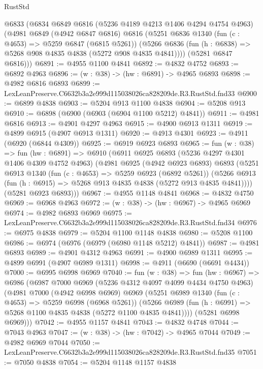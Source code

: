 \begin{lexlean}{RustStd}
\begin{coremodule}
  @6833
    (@6834
      @6849
      @6816
      (@5236 @4189 @4213 @1406 @4294 @4754 @4963)
      (@4981
        @6849
        (@4942 @6847 @6816)
        @6816
        (@5251
          @6836
          @1340
          (fun (c : @4653) => @5259 @6847 (@6815 @5261))
          (@5266 @6836 (fun (h : @6838) => @5268 @908 @4835 @4838 (@5272 @908 @4835 @4841))))
        (@5281 @6847 @6816)))
@6891 := @4955 @1100 @4841
@6892 := @4832 @4752
@6893 := @6892 @4963
@6896 := (w : @38) -> (hw : @6891) -> @4965 @6893
@6898 := @4982 @6816 @6893
@6899 := LexLeanPreserve.C6632b3a2e999d115038026ca828209de.R3.RustStd.fnd33
@6900 := @6899 @4838
@6903 := @5204 @913 @1100 @4838
@6904 := @5208 @913
@6910 := @6898 (@6900 (@6903 (@6904 @1100 @5212) @4841))
@6911 := @4981 @6816
@6913 := @4901 @4297 @4963
@6915 := @4900 @6913 @1311
@6919 := @4899 @6915 (@4907 @6913 @1311)
@6920 := @4913 @4301
@6923 := @4911 (@6920 (@6844 @4309))
@6925 := @6919 @6923 @6893
@6965 := fun (w : @38) =>
  fun (hw : @6891) =>
  @6910
    (@6911
      @6925
      @6893
      (@5236 @4297 @4301 @1406 @4309 @4752 @4963)
      (@4981
        @6925
        (@4942 @6923 @6893)
        @6893
        (@5251
          @6913
          @1340
          (fun (c : @4653) => @5259 @6923 (@6892 @5261))
          (@5266 @6913 (fun (h : @6915) => @5268 @913 @4835 @4838 (@5272 @913 @4835 @4841))))
        (@5281 @6923 @6893)))
@6967 := @4955 @1148 @4841
@6968 := @4832 @4750
@6969 := @6968 @4963
@6972 := (w : @38) -> (hw : @6967) -> @4965 @6969
@6974 := @4982 @6893 @6969
@6975 := LexLeanPreserve.C6632b3a2e999d115038026ca828209de.R3.RustStd.fnd34
@6976 := @6975 @4838
@6979 := @5204 @1100 @1148 @4838
@6980 := @5208 @1100
@6986 := @6974 (@6976 (@6979 (@6980 @1148 @5212) @4841))
@6987 := @4981 @6893
@6989 := @4901 @4312 @4963
@6991 := @4900 @6989 @1311
@6995 := @4899 @6991 (@4907 @6989 @1311)
@6998 := @4911 (@6690 (@6691 @4434))
@7000 := @6995 @6998 @6969
@7040 := fun (w : @38) =>
  fun (hw : @6967) =>
  @6986
    (@6987
      @7000
      @6969
      (@5236 @4312 @4097 @4099 @4434 @4750 @4963)
      (@4981
        @7000
        (@4942 @6998 @6969)
        @6969
        (@5251
          @6989
          @1340
          (fun (c : @4653) => @5259 @6998 (@6968 @5261))
          (@5266 @6989 (fun (h : @6991) => @5268 @1100 @4835 @4838 (@5272 @1100 @4835 @4841))))
        (@5281 @6998 @6969)))
@7042 := @4955 @1157 @4841
@7043 := @4832 @4748
@7044 := @7043 @4963
@7047 := (w : @38) -> (hw : @7042) -> @4965 @7044
@7049 := @4982 @6969 @7044
@7050 := LexLeanPreserve.C6632b3a2e999d115038026ca828209de.R3.RustStd.fnd35
@7051 := @7050 @4838
@7054 := @5204 @1148 @1157 @4838

\end{coremodule}
\end{lexlean}
